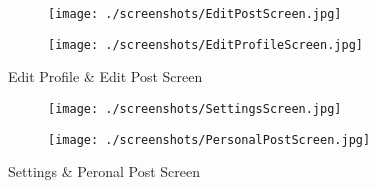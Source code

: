     \begin{figure}
      \centering
      \begin{subfigure}{.5\textwidth}
        \centering
        \texttt{[image: ./screenshots/EditPostScreen.jpg]}
        \label{fig:editpost}
      \end{subfigure}%
      \begin{subfigure}{.5\textwidth}
        \centering
        \texttt{[image: ./screenshots/EditProfileScreen.jpg]}
        \label{fig:editprofile}
      \end{subfigure}
      \caption{Edit Profile \& Edit Post Screen}
      \label{fig:editpostandprofile}
      \end{figure}

    \begin{figure}
      \centering
      \begin{subfigure}{.5\textwidth}
        \centering
        \texttt{[image: ./screenshots/SettingsScreen.jpg]}
        \label{fig:settings}
      \end{subfigure}%
      \begin{subfigure}{.5\textwidth}
        \centering
        \texttt{[image: ./screenshots/PersonalPostScreen.jpg]}
        \label{fig:PeronalPost}
      \end{subfigure}
      \caption{Settings \& Peronal Post Screen}
      \label{fig:SettingsandPersonalPost}
      \end{figure}